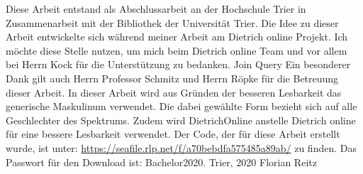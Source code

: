\preface

Diese Arbeit entstand als Abschlussarbeit an der Hochschule Trier in Zusammenarbeit mit der Bibliothek der Universität Trier. 
\newline
\newline
Die Idee zu dieser Arbeit entwickelte sich während meiner Arbeit am Dietrich online Projekt. Ich möchte diese Stelle nutzen, um mich beim Dietrich online Team und vor allem bei Herrn Kock für die Unterstützung zu bedanken.
\newline
Join
Query
\newline
Ein besonderer Dank gilt auch Herrn Professor Schmitz und Herrn Röpke für die Betreuung dieser Arbeit.
\newline
\newline
In dieser Arbeit wird aus Gründen der besseren Lesbarkeit das generische Maskulinum verwendet. Die dabei gewählte Form bezieht sich auf alle Geschlechter des Spektrums. 
\newline
Zudem wird DietrichOnline anstelle Dietrich online für eine bessere Lesbarkeit verwendet.
\newline
\newline
Der Code, der für diese Arbeit erstellt wurde, ist unter: \url{https://seafile.rlp.net/f/a70bebdfa575485a89ab/} zu finden. Das Passwort für den Download ist: Bachelor2020.
\newline
\newline
Trier, 2020
\newline
\noindent Florian Reitz